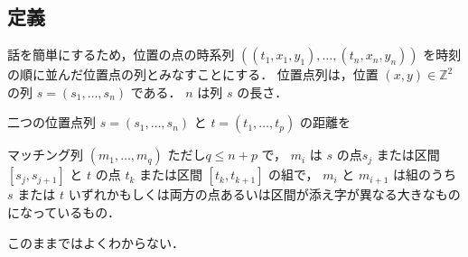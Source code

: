 \documentclass[11pt]{jreport}
\begin{document}
\subsection*{定義}
話を簡単にするため，位置の点の時系列 $((t_1, x_1, y_1), \ldots,(t_n,x_n,y_n))$ を時刻の順に並んだ位置点の列とみなすことにする．
位置点列は，位置 $(x,y) \in \mathbb{Z}^2$ の列 $s = (s_1, \ldots, s_n)$ である．
$n$ は列 $s$ の長さ．

\begin{defn}[位置点列マッチング]
二つの位置点列 $s = (s_1, \ldots, s_n)$ と $t = (t_1, \ldots, t_p)$ の距離を

マッチング列 $(m_1, \ldots, m_q)$ ただし$q \leq n+p$ で，
$m_i$ は $s$ の点$s_j$ または区間 $[s_j,s_{j+1}]$ と $t$ の点 $t_k$ または区間 $[t_k, t_{k+1}]$ の組で，
$m_i$ と $m_{i+1}$ は組のうち $s$ または $t$ いずれかもしくは両方の点あるいは区間が添え字が異なる大きなものになっているもの．
\end{defn}
このままではよくわからない．
\end{document}
